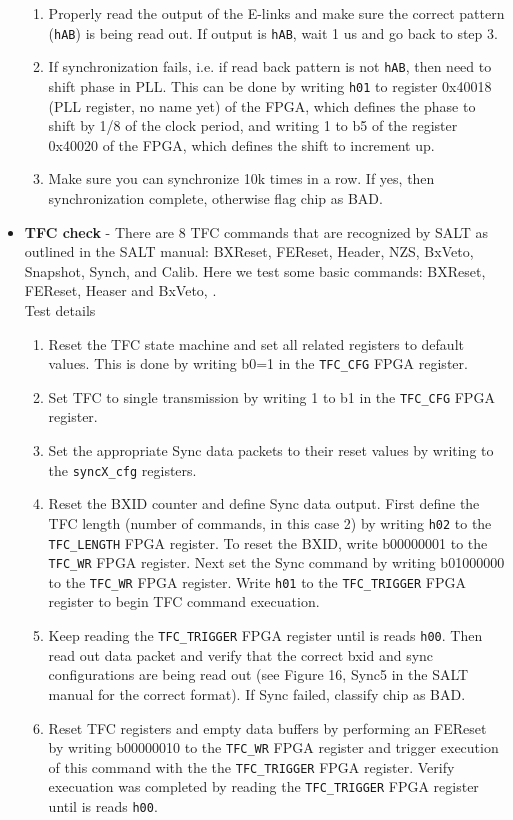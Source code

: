 \documentclass{lhcbnote}
\begin{document}
\begin{itemize}
\begin{enumerate}
\item Properly read the output of the E-links and make sure the correct pattern (\texttt{hAB}) is being read out. If output is \texttt{hAB}, wait 1 us and go back to step 3.
\item If synchronization fails, i.e. if read back pattern is not \texttt{hAB}, then need to shift phase in PLL. This can be done by writing \texttt{h01} to register 0x40018 (PLL register, no name yet) of the FPGA, which defines the phase to shift by 1/8 of the clock period, and writing 1 to b5 of the register 0x40020 of the FPGA, which defines the shift to increment up.
\item Make sure you can synchronize 10k times in a row. If yes, then synchronization complete, otherwise flag chip as BAD.
\end{enumerate}
\item \textbf{TFC check} - There are 8 TFC commands that are recognized by SALT as outlined in the SALT manual: BXReset, FEReset, Header, NZS, BxVeto, Snapshot, Synch, and Calib. Here we test some basic commands: BXReset, FEReset, Heaser and BxVeto, . \\
Test details
\begin{enumerate}
\item Reset the TFC state machine and set all related registers to default values. This is done by writing b0=1 in the \texttt{TFC\_CFG} FPGA register.
\item Set TFC to single transmission by writing 1 to b1 in the \texttt{TFC\_CFG} FPGA register.
\item Set the appropriate Sync data packets to their reset values by writing to the \texttt{syncX\_cfg} registers. 
\item Reset the BXID counter and define Sync data output. First define the TFC length (number of commands, in this case 2) by writing \texttt{h02} to the \texttt{TFC\_LENGTH} FPGA register. To reset the BXID, write b00000001 to the \texttt{TFC\_WR} FPGA register. Next set the Sync command by writing b01000000 to the \texttt{TFC\_WR} FPGA register. Write \texttt{h01} to the \texttt{TFC\_TRIGGER} FPGA register to begin TFC command execuation.
\item Keep reading the \texttt{TFC\_TRIGGER} FPGA register until is reads \texttt{h00}. Then read out data packet and verify that the correct bxid and sync configurations are being read out (see Figure 16, Sync5 in the SALT manual for the correct format). If Sync failed, classify chip as BAD.
\item Reset TFC registers and empty data buffers by performing an FEReset by writing b00000010 to the \texttt{TFC\_WR} FPGA register and trigger execution of this command with the the \texttt{TFC\_TRIGGER} FPGA register. Verify execuation was completed by reading the \texttt{TFC\_TRIGGER} FPGA register until is reads \texttt{h00}.

\end{enumerate}
\end{itemize}
\end{document}
